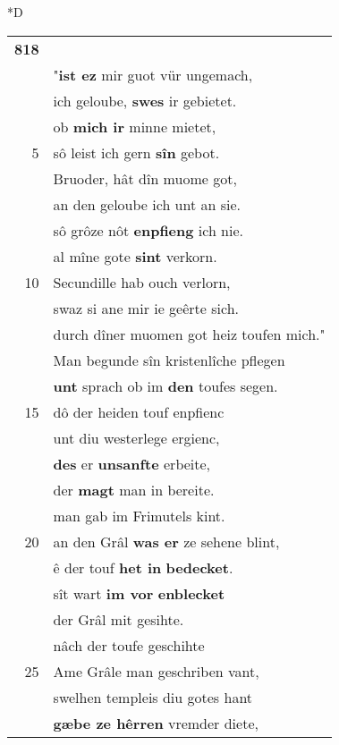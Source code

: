 \documentclass[8pt,a4paper,notitlepage]{article}
\begin{document}
\begin{table}[ht]
\begin{minipage}[t]{0.5\linewidth}
\small
\begin{center}*D
\end{center}
\begin{tabular}{rl}
\textbf{818} & \textit{\begin{large}F\end{large}}eirefiz zem priester sprach:\\ 
 & "\textbf{ist ez} mir guot vür ungemach,\\ 
 & ich geloube, \textbf{swes} ir gebietet.\\ 
 & ob \textbf{mich ir} minne mietet,\\ 
5 & sô leist ich gern \textbf{sîn} gebot.\\ 
 & Bruoder, hât dîn muome got,\\ 
 & an den geloube ich unt an sie.\\ 
 & sô grôze nôt \textbf{enpfieng} ich nie.\\ 
 & al mîne gote \textbf{sint} verkorn.\\ 
10 & Secundille hab ouch verlorn,\\ 
 & swaz si ane mir ie geêrte sich.\\ 
 & durch dîner muomen got heiz toufen mich."\\ 
 & Man begunde sîn kristenlîche pflegen\\ 
 & \textbf{unt} sprach ob im \textbf{den} toufes segen.\\ 
15 & dô der heiden touf enpfienc\\ 
 & unt diu westerlege ergienc,\\ 
 & \textbf{des} er \textbf{unsanfte} erbeite,\\ 
 & der \textbf{magt} man in bereite.\\ 
 & man gab im Frimutels kint.\\ 
20 & an den Grâl \textbf{was er} ze sehene blint,\\ 
 & ê der touf \textbf{het in} \textbf{bedecket}.\\ 
 & sît wart \textbf{im vor} \textbf{enblecket}\\ 
 & der Grâl mit gesihte.\\ 
 & nâch der toufe geschihte\\ 
25 & Ame Grâle man geschriben vant,\\ 
 & swelhen templeis diu gotes hant\\ 
 & \textbf{gæbe ze hêrren} vremder diete,\\ 

\end{tabular}
\end{minipage}
\end{table}
\end{document}
